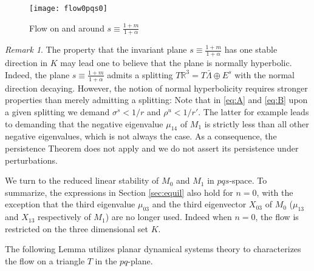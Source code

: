 \documentclass[usletter,11pt]{article}
\theoremstyle{remark}
\newtheorem{remark}{Remark}[section]
\begin{document}
\begin{figure}[ht] 
 \centering
 \texttt{[image: flow0pqs0]} 
 \caption{Flow on and around $s\equiv\tfrac{1+m}{1+ \alpha}$} \label{fig:n0pqs}
\end{figure}

\begin{remark} \label{plane_hyp}
The property that the invariant plane $s\equiv\tfrac{1+m}{1+ \alpha}$ has one stable direction in $K$  may lead one to believe that the plane is normally hyperbolic. 
Indeed, the plane $s\equiv\tfrac{1+m}{1+ \alpha}$ admits a splitting $T\mathbb{R}^3=T\bar\Lambda \oplus E^s$ with the normal direction decaying.
However, the notion of normal hyperbolicity requires stronger properties than merely admitting a splitting: Note that in \eqref{eq:A} and \eqref{eq:B} upon a given splitting we demand $\sigma^s<1/r$ and $\rho^u<1/r'$. The latter for example leads to demanding that the negative eigenvalue $\mu_{14}$ of $M_1$ is strictly less than all other negative eigenvalues, which is not always the case. As a consequence, the persistence Theorem does not apply and we do not assert its persistence under perturbations.
\end{remark}


We turn to the reduced linear stability of $M_0$ and $M_1$ in $pqs$-space. To summarize, the expressions in Section \ref{sec:equil} also hold for $n=0$, with the exception that the third eigenvalue $\mu_{03}$ and the third eigenvector $X_{03}$ of $M_0$ ($\mu_{13}$ and $X_{13}$ respectively of $M_1$) are no longer used. Indeed when $n=0$, the flow is restricted on the three dimensional set $K$. %

The following Lemma utilizes planar dynamical systems theory to characterizes the flow on a triangle $T$ in the $pq$-plane. %
\end{document}

